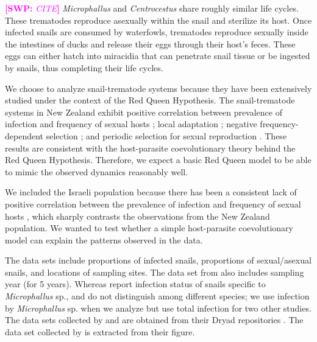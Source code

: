 \documentclass{article}\usepackage[]{graphicx}\usepackage[]{color}
\newcommand{\comment}[3]{\textcolor{#1}{\textbf{[#2: }\textit{#3}\textbf{]}}}
\newcommand{\swp}[1]{\comment{magenta}{SWP}{#1}}
\begin{document}
\swp{CITE}
\textit{Microphallus} and \textit{Centrocestus} share roughly similar life cycles. 
These trematodes reproduce asexually within the snail and sterilize its host.
Once infected snails are consumed by waterfowls, trematodes reproduce sexually
inside the intestines of ducks and release their eggs through their host's 
feces.
These eggs can either hatch into miracidia that can penetrate snail tissue or
be ingested by snails, thus completing their life cycles.

We choose to analyze snail-trematode systems because they have been extensively studied under the context of the Red Queen Hypothesis.
The snail-trematode systems in New Zealand exhibit positive correlation between prevalence of infection and frequency of sexual hosts \citep{lively2002temporal, king2011parasites, vergara2013geographic, mckone2016fine, gibson2016within}; local adaptation \citep{lively1989adaptation, lively2004host, king2011coevolutionary}; negative frequency-dependent selection \citep{dybdahl1995host, dybdahl1998host,jokela2009maintenance, koskella2009evidence}; and periodic selection for sexual reproduction \citep{vergara2014infection, gibson2018periodic}. 
These results are consistent with the host-parasite coevolutionary theory behind the Red Queen Hypothesis.
Therefore, we expect a basic Red Queen model to be able to mimic the observed dynamics reasonably well.

We included the Israeli population because there has been a consistent lack of positive correlation between the prevalence of infection and frequency of sexual hosts \citep{heller1990sexual, ben2005spatial, ben2007temporal, ben2008sex, dagan2013clonal}, which sharply contrasts the observations from the New Zealand population.
We wanted to test whether a simple host-parasite coevolutionary model can explain the patterns observed in the data.

The data sets include proportions of infected snails, proportions of sexual/asexual snails, and locations of sampling sites. 
The data set from \cite{vergara2014infection} also includes sampling year (for 5 years).
Whereas \cite{vergara2014infection} report infection status of snails specific to \textit{Microphallus} sp., \cite{mckone2016fine} and \cite{dagan2013clonal} do not distinguish among different species;
we use infection by \textit{Microphallus} sp. when we analyze \cite{vergara2014infection}
but use total infection for two other studies.
The data sets collected by \cite{dagan2013clonal} and \cite{vergara2014infection} are obtained from their Dryad repositories \citep{dryad_f5t56, dryad_29nk3_2}. 
The data set collected by \cite{mckone2016fine} is extracted from their figure.
\end{document}
